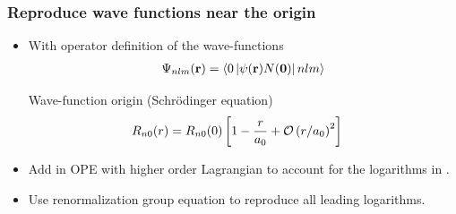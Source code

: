 
	





\begin{frame}
	\frametitle{Reproduce wave functions near the origin}

	
	
	\begin{itemize}
		\item With operator definition of the wave-functions 
		\begin{align}
			\Psi_{nlm}({\bf r})=\left\langle 0\left\vert\psi({\bf r})N({\bf 0})\right\vert nlm \right\rangle
		\end{align}
	\begin{block}{\large Wave-function origin (Schr\"odinger equation)}
		\begin{align}
			& R_{n0}(r)= R_{n0}(0)
		  \left[1-{r\over a_0}+{\mathcal O}\left(r/a_0\right)^2\right]
		\end{align}
	\end{block}
	\item Add  in OPE with higher order Lagrangian to account for the logarithms in . 
	\item Use renormalization group equation to reproduce all leading logarithms. 
	\end{itemize}

\end{frame}

